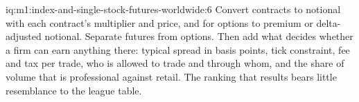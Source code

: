 \begin{solution}{iq:m1:index-and-single-stock-futures-worldwide:6}
Convert contracts to notional with each contract's multiplier and price, and
for options to premium or delta-adjusted notional. Separate futures from
options. Then add what decides whether a firm can earn anything there:
typical spread in basis points, tick constraint, fee and tax per trade, who
is allowed to trade and through whom, and the share of volume that is
professional against retail. The ranking that results bears little
resemblance to the league table.
\end{solution}

